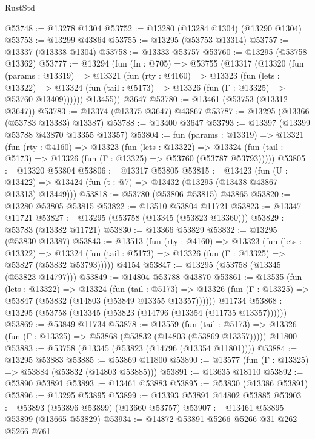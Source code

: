 \begin{lexlean}{RustStd}
\begin{coremodule}
@53748 := @13278 @1304
@53752 := @13280 (@13284 @1304) (@13290 @1304)
@53753 := @13299 @43864
@53755 := @13295 (@53753 @13314)
@53757 := @13337 (@13338 @1304)
@53758 := @13333 @53757
@53760 := @13295 (@53758 @13362)
@53777 := @13294
    (fun (fn : @705) =>
    @53755
      (@13317
        (@13320
          (fun (params : @13319) =>
          @13321
            (fun (rty : @4160) =>
            @13323
              (fun (lets : @13322) =>
              @13324 (fun (tail : @5173) => @13326 (fun (Γ : @13325) => @53760 @13409))))))
        @13455))
    @3647
@53780 := @13461 (@53753 (@13312 @3647))
@53783 := @13374 (@13375 @3647) @43867
@53787 := @13295 (@13366 (@53783 @13383) @13387)
@53788 := @13400 @3647
@53793 := @13397 (@13399 @53788 @43870 @13355 @13357)
@53804 := fun (params : @13319) =>
  @13321
    (fun (rty : @4160) =>
    @13323
      (fun (lets : @13322) =>
      @13324 (fun (tail : @5173) => @13326 (fun (Γ : @13325) => @53760 (@53787 @53793)))))
@53805 := @13320 @53804
@53806 := @13317 @53805
@53815 := @13423
    (fun (U : @13422) => @13424 (fun (t : @7) => @13432 (@13295 (@13438 @43867 @13313) @13449)))
@53818 := @53780 (@53806 @53815) @43865
@53820 := @13280 @53805 @53815
@53822 := @13510 @53804 @11721
@53823 := @13347 @11721
@53827 := @13295 (@53758 (@13345 (@53823 @13360)))
@53829 := @53783 (@13382 @11721)
@53830 := @13366 @53829
@53832 := @13295 (@53830 @13387)
@53843 := @13513
    (fun (rty : @4160) =>
    @13323
      (fun (lets : @13322) =>
      @13324 (fun (tail : @5173) => @13326 (fun (Γ : @13325) => @53827 (@53832 @53793)))))
    @4154
@53847 := @13295 (@53758 (@13345 (@53823 @14797)))
@53849 := @14804 @53788 @43870
@53861 := @13535
    (fun (lets : @13322) =>
    @13324
      (fun (tail : @5173) =>
      @13326 (fun (Γ : @13325) => @53847 (@53832 (@14803 (@53849 @13355 @13357))))))
    @11734
@53868 := @13295 (@53758 (@13345 (@53823 (@14796 (@13354 (@11735 @13357))))))
@53869 := @53849 @11734
@53878 := @13559
    (fun (tail : @5173) => @13326 (fun (Γ : @13325) => @53868 (@53832 (@14803 (@53869 @13357)))))
    @11800
@53883 := @53758 (@13345 (@53823 (@14796 (@13354 @11801))))
@53884 := @13295 @53883
@53885 := @53869 @11800
@53890 := @13577 (fun (Γ : @13325) => @53884 (@53832 (@14803 @53885)))
@53891 := @13635 @18110
@53892 := @53890 @53891
@53893 := @13461 @53883
@53895 := @53830 (@13386 @53891)
@53896 := @13295 @53895
@53899 := @13393 @53891 @14802 @53885
@53903 := @53893 (@53896 @53899) (@13660 @53757)
@53907 := @13461 @53895 @53899 (@13665 @53829)
@53934 := @14872
    @53891
    @5266
    @5266
    @31
    @262
    @5266
    @761

\end{coremodule}
\end{lexlean}
